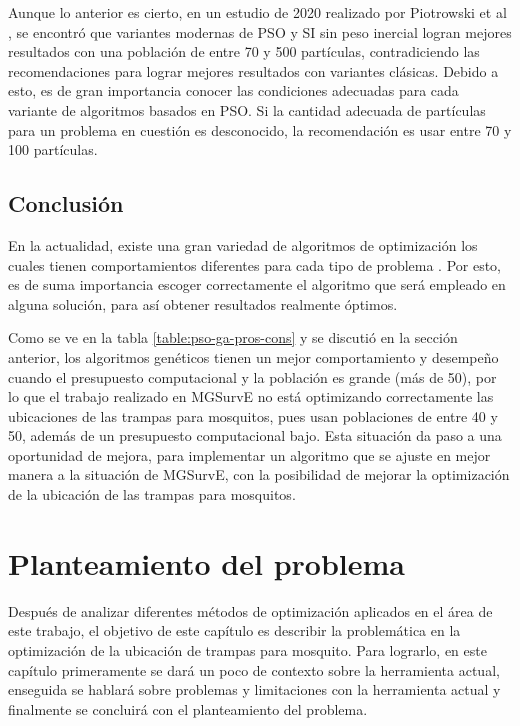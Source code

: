 \documentclass[letterpaper]{report}
\begin{document}
  Aunque lo anterior es cierto, en un estudio de 2020 realizado por Piotrowski
  et al \cite{PSOPopulationSize}, se encontró que variantes modernas de PSO y
  SI sin peso inercial
  logran mejores resultados con una población de entre 70 y 500 partículas,
  contradiciendo las recomendaciones para lograr mejores resultados con
  variantes clásicas.
  Debido a esto, es de gran importancia conocer las condiciones adecuadas para
  cada variante de algoritmos basados en PSO. Si la cantidad adecuada de
  partículas para un problema en cuestión es desconocido, la recomendación es
  usar entre 70 y 100 partículas.

\section{Conclusión}
  En la actualidad, existe una gran variedad de algoritmos de optimización los
  cuales tienen comportamientos diferentes para cada tipo de problema
  \cite{SwarmVsEvol}. Por esto, es de suma importancia escoger correctamente el
  algoritmo que será empleado en alguna solución, para así obtener resultados
  realmente óptimos.

  Como se ve en la tabla \ref{table:pso-ga-pros-cons} y se discutió en la
  sección anterior, los algoritmos genéticos tienen un mejor comportamiento y
  desempeño cuando el presupuesto computacional y la población es grande
  (más de 50), por lo que el trabajo realizado en MGSurvE \cite{MGSurvE} no
  está optimizando correctamente las ubicaciones de las trampas para mosquitos,
  pues usan poblaciones de entre 40 y 50, además de un presupuesto computacional
  bajo. Esta situación da paso a una oportunidad de mejora, para implementar un
  algoritmo que se ajuste en mejor manera a la situación de MGSurvE, con la
  posibilidad de mejorar la optimización de la ubicación de las trampas para
  mosquitos.

\chapter{Planteamiento del problema}\label{chap:planteaminto}
  Después de analizar diferentes métodos de optimización aplicados en el área de
  este trabajo, el objetivo de este capítulo es describir la problemática en
  la optimización de la ubicación de trampas para mosquito. Para lograrlo, en
  este 
  capítulo primeramente se dará un poco de contexto sobre la herramienta actual,
  enseguida se hablará sobre problemas y limitaciones con la herramienta actual
  y finalmente se concluirá con el planteamiento del problema.
\end{document}
